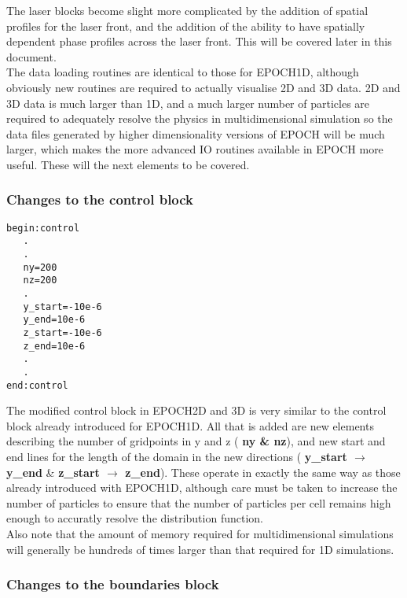 \documentclass[12pt]{article}
\newcommand{\boxverbatim}[1]{\begin{Verbatim}[obeytabs=true,frame=single,
  framerule=0.5mm,rulecolor=\color{warwickmid},label=#1]}
\newcommand{\inlineemph}[1]{{\color{warwicklight} \bf{#1}}}
\newcommand{\nEPOCH}{{\color{warwickdark}\fontfamily{phv}\selectfont EPOCH}}
\newcommand{\EPOCH}{{\nEPOCH} }
\begin{document}
The laser blocks become slight more complicated by the addition of spatial
profiles for the laser front, and the addition of the ability to have spatially
dependent phase profiles across the laser front. This will be covered later in
this document.\\

The data loading routines are identical to those for EPOCH1D, although
obviously new routines are required to actually visualise 2D and 3D data. 2D
and 3D data is much larger than 1D, and a much larger number of particles are
required to adequately resolve the physics in multidimensional simulation so
the data files generated by higher dimensionality versions of \EPOCH will be
much larger, which makes the more advanced IO routines available in \EPOCH more
useful. These will the next elements to be covered.\\

\subsubsection{Changes to the \inlineemph{control} block}

\boxverbatim{Changed control block}
begin:control
   .
   .
   ny=200
   nz=200
   .
   y_start=-10e-6
   y_end=10e-6
   z_start=-10e-6
   z_end=10e-6
   .
   .
end:control
\end{Verbatim}

The modified control block in EPOCH2D and 3D is very similar to the control
block already introduced for EPOCH1D. All that is added are new elements
describing the number of gridpoints in y and z (\inlineemph{ny \& nz}), and
new start and end lines for the length of the domain in the new directions
(\inlineemph{y\_start $\rightarrow$ y\_end} \& \inlineemph{z\_start $\rightarrow$ z\_end}). These
operate in exactly the same way as those already introduced with EPOCH1D,
although care must be taken to increase the number of particles to ensure that
the number of particles per cell remains high enough to accuratly resolve the
distribution function.\\

Also note that the amount of memory required for multidimensional simulations
will generally be hundreds of times larger than that required for 1D
simulations.\\

\subsubsection{Changes to the \inlineemph{boundaries} block}
\end{document}
